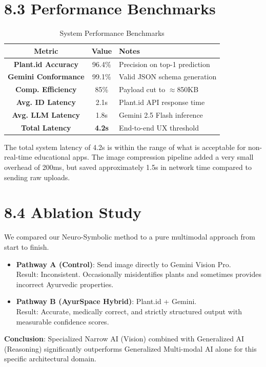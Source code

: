 \documentclass[12pt]{article}
\begin{document}
\section*{8.3 \quad Performance Benchmarks}

\begin{table}[htbp]
\caption{System Performance Benchmarks}
\begin{center}
\begin{tabular}{|c|c|l|}
\hline
\textbf{Metric} & \textbf{Value} & \textbf{Notes} \\
\hline
\textbf{Plant.id Accuracy} & 96.4\% & Precision on top-1 prediction \\
\hline
\textbf{Gemini Conformance} & 99.1\% & Valid JSON schema generation \\
\hline
\textbf{Comp. Efficiency} & 85\% & Payload cut to $\approx$850KB \\
\hline
\textbf{Avg. ID Latency} & 2.1s & Plant.id API response time \\
\hline
\textbf{Avg. LLM Latency} & 1.8s & Gemini 2.5 Flash inference \\
\hline
\textbf{Total Latency} & \textbf{4.2s} & End-to-end UX threshold \\
\hline
\end{tabular}
\end{center}
\end{table}

The total system latency of 4.2s is within the range of what is acceptable for non-real-time
educational apps. The image compression pipeline added a very small overhead of 200ms, but saved
approximately 1.5s in network time compared to sending raw uploads.

\section*{8.4 \quad Ablation Study}

We compared our Neuro-Symbolic method to a pure multimodal approach from start to finish.

\begin{itemize}
    \item \textbf{Pathway A (Control)}: Send image directly to Gemini Vision Pro.\\
    Result: Inconsistent. Occasionally misidentifies plants and sometimes provides incorrect
    Ayurvedic properties.

    \item \textbf{Pathway B (AyurSpace Hybrid)}: Plant.id + Gemini.\\
    Result: Accurate, medically correct, and strictly structured output with measurable
    confidence scores.
\end{itemize}

\textbf{Conclusion}: Specialized Narrow AI (Vision) combined with Generalized AI (Reasoning)
significantly outperforms Generalized Multi-modal AI alone for this specific architectural domain.
\end{document}
